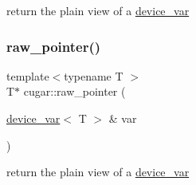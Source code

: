 return the plain view of a \hyperlink{structcugar_1_1device__var}{device\+\_\+var} \mbox{\label{namespacecugar_a2b9a0dd7326d84ea851ab4cee4edaec4}} 
\subsubsection{\texorpdfstring{raw\+\_\+pointer()}{raw\_pointer()}\hspace{0.1cm}{\footnotesize\ttfamily [6/6]}}
{\footnotesize\ttfamily template$<$typename T $>$ \\
T$\ast$ cugar\+::raw\+\_\+pointer (\begin{DoxyParamCaption}\item[{\hyperlink{structcugar_1_1device__var}{device\+\_\+var}$<$ T $>$ \&}]{var }\end{DoxyParamCaption})}

return the plain view of a \hyperlink{structcugar_1_1device__var}{device\+\_\+var} 